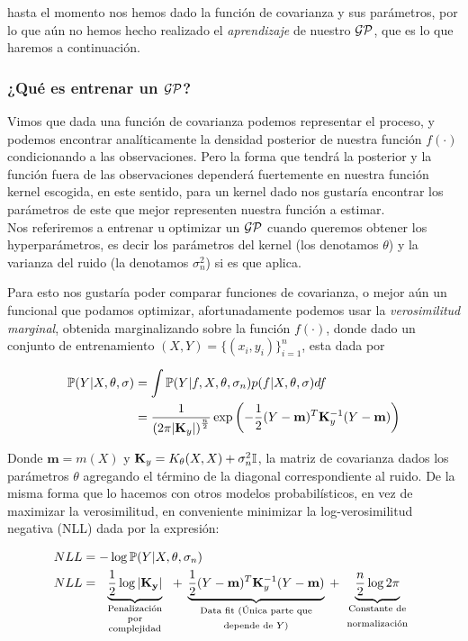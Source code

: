 hasta el momento nos hemos dado la función de covarianza y sus parámetros, por lo que aún no hemos hecho realizado el \textit{aprendizaje} de nuestro $\mathcal{GP}$, que es lo que haremos a continuación.

\subsubsection{¿Qué es entrenar un \texorpdfstring{$\mathcal{GP}$}{GP}?}

Vimos que dada una función de covarianza podemos representar el proceso, y podemos encontrar analíticamente la densidad posterior de nuestra función $f(\cdot)$ condicionando a las observaciones. Pero la forma que tendrá la posterior y la función fuera de las observaciones dependerá fuertemente en nuestra función kernel escogida, en este sentido, para un kernel dado nos gustaría encontrar los parámetros de este que mejor representen nuestra función a estimar.\\

Nos referiremos a entrenar u optimizar un $\mathcal{GP}$ cuando queremos obtener los hyperparámetros, es decir los parámetros del kernel (los denotamos $\theta$) y la varianza del ruido (la denotamos $\sigma_n^2$) si es que aplica.

Para esto nos gustaría poder comparar funciones de covarianza, o mejor aún un funcional que podamos optimizar, afortunadamente podemos usar la \textit{verosimilitud marginal}, obtenida marginalizando sobre la función $f(\cdot)$, donde dado un conjunto de entrenamiento $(X, Y)= \{(x_i, y_i)\}_{i=1}^{n}$, esta dada por

\begin{align}
	\mathbb{P}(Y|X, \theta, \sigma) & = \int \mathbb{P}(Y|f, X, \theta, \sigma_n) p(f|X,\theta, \sigma) df \\
	& = \frac{1}{\left( 2\pi |\mathbf{K}_y|\right)^{\frac{n}{2}}} 
	\exp \left(
	-\frac{1}{2} (Y - \mathbf{m})^T \mathbf{K}_y^{-1} (Y - \mathbf{m})
	\right)
\end{align}

Donde $\mathbf{m}=m(X)$ y $\mathbf{K}_y=K_{\theta}(X,X) + \sigma_n^2 {\mathbb I}$, la matriz de covarianza dados los parámetros $\theta$ agregando el término de la diagonal correspondiente al ruido. De la misma forma que lo hacemos con otros modelos probabilísticos, en vez de maximizar la verosimilitud, en conveniente minimizar la log-verosimilitud negativa (NLL) dada por la expresión:

\begin{align}
	NLL & = -\log \pr(Y|X, \theta, \sigma_n) \\
	NLL & = \underbrace{ \color{black}{\frac{1}{2}\log|\mathbf{K_y}|} }_
	    {\text{\parbox{2cm}{\centering Penalización\\[-4pt] por\\[-4pt] complejidad}}}
	    + \underbrace{ \color{black}{\frac{1}{2}(Y - \mathbf{m})^T \mathbf{K}_y^{-1} (Y - \mathbf{m}) }}_
	    {\text{\parbox{4cm}{\centering Data fit (Única parte que depende de $Y$)}}}
	    + \underbrace{ \color{black}{\frac{n}{2} \log2\pi}}_
	    {\text{\parbox{2cm}{\centering Constante de normalización}}}\label{eq:gp_nll}
\end{align}

